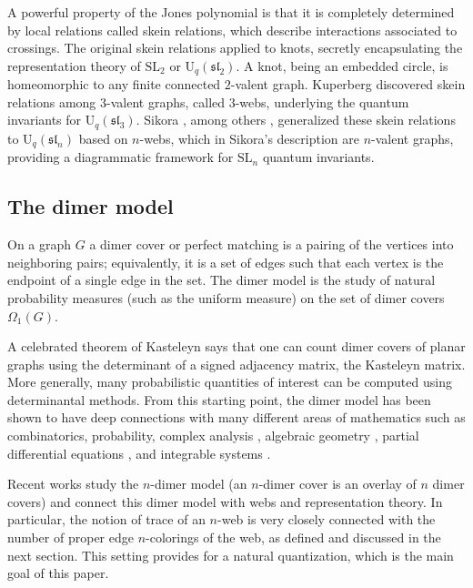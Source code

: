 \documentclass[12pt, reqno]{amsart}
\theoremstyle{definition}
\newcommand{\SL}{\mathrm{SL}}%
\begin{document}
A powerful property of the Jones polynomial is that it is completely determined by local relations called skein relations, which describe interactions associated to crossings.  The original skein relations applied to knots, secretly encapsulating the representation theory of $\SL_2$ or $\mathrm{U}_q(\mathfrak{sl}_2)$.  A knot, being an embedded circle, is homeomorphic to any finite connected $2$-valent graph.  Kuperberg \cite{kuperberg} discovered skein relations among $3$-valent graphs, called $3$-webs, underlying the quantum invariants for $\mathrm{U}_q(\mathfrak{sl}_3)$.  Sikora \cite{sikora1}, among others \cite{ckm, moy}, generalized these skein relations to $\mathrm{U}_q(\mathfrak{sl}_n)$ based on $n$-webs, which in Sikora's description are $n$-valent graphs, providing a diagrammatic framework for $\SL_n$ quantum invariants.  

\subsection{The dimer model}

On a graph $G$ a dimer cover or perfect matching is a pairing of the vertices into neighboring pairs; equivalently,   it is a set of edges such that each vertex is the endpoint of a single edge in the set. The dimer model is the study of   natural probability measures (such as the uniform measure) on the set of dimer covers $\Omega_1(G)$.  

A celebrated theorem of Kasteleyn \cite{Kasteleyn} says that one can count dimer covers of planar graphs using the determinant of a signed adjacency matrix,   the Kasteleyn matrix.  More generally, many probabilistic quantities of interest can be computed using determinantal methods.   From this starting point, the dimer model has been shown to have deep connections with many different areas of mathematics such as   combinatorics, probability, complex analysis \cite{Kenyon.conformal}, algebraic geometry \cite{KO2, KOS}, partial differential equations   \cite{CKP, KO2, KenyonPrause}, and integrable systems \cite{GoncharovKenyon}.

Recent works \cite{cohenetal, DKS, fll19, KenyonShi, KenyonOvenhouse, lam15, tata2024rankndimermodelssurfaces} study the $n$-dimer model   (an $n$-dimer cover is an overlay of $n$ dimer covers) and connect this dimer model with webs and representation theory.   In particular, the notion of trace of an $n$-web is very closely connected with the number of proper edge $n$-colorings of the web,   as defined and discussed in the next section. This setting provides for a natural quantization, which is the main goal of this paper. 
\end{document}
